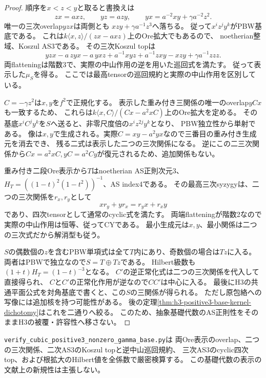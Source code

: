 \begin{proof}
順序を$x<z<y$と取ると書換えは
\[
 zx=axz,\qquad yz=azy,\qquad
 yx=a^{-2}xy+\gamma a^{-2}z^2.
\]
唯一の三次overlap$yzx$は両側とも
$xzy+\gamma a^{-1}z^3$へ落ちる。
従って$x^iz^jy^k$がPBW基底である。
これは$k\langle x,z\rangle/(zx-axz)$上のOre拡大でもあるので、
noetherian整域、Koszul AS3である。
その三次Koszul topは
\[
 yzx-a\,zyx-a\,yxz+a^{-1}xyz+a^{-1}zxy-xzy
                   +\gamma a^{-1}zzz.
\]
両flatteningは階数3で、実際の中山作用の逆を用いた巡回式を満たす。
従って表示した$\mu_S$を得る。
ここでは最高tensorの巡回規約と実際の中山作用を区別している。

$C=-\gamma z^2$は$x,y$を$f^2$で正規化する。
表示した重み付き三関係の唯一のoverlap$yCx$も一致するため、
これらは$k\langle x,C\rangle/(Cx-a^2xC)$上のOre拡大を定める。
その基底$x^iC^jy^k$を$S$へ送ると、非零尺度倍の$x^iz^{2j}y^k$となり、
PBW独立性から単射である。
像は$x,y$で生成される。実際$C=xy-a^2yx$なので三番目の重み付き生成元を消去でき、
残る二式は表示した二つの三次関係になる。
逆にこの二三次関係から$Cx=a^2xC,yC=a^2Cy$が復元されるため、追加関係もない。

重み付き二段Ore表示から$T$はnoetherian AS正則次元3、
$H_T=((1-t)^2(1-t^2))^{-1}$、AS index4である。
その最高三次syzygyは、二つの三次関係を$r_x,r_y$として
\[
 xr_y+yr_x=r_yx+r_xy
\]
であり、四次tensorとして通常のcyclic式を満たす。
両端flatteningが階数2なので実際の中山作用は恒等、従ってCYである。
最小生成元は$x,y$、最小関係は二つの三次式だから解消型も従う。

$S$の偶数個の$z$を含むPBW単項式は全て$T$内にあり、奇数個の場合は$Tz$に入る。
両者はPBWで独立なので$S=T\oplus Tz$である。
Hilbert級数も$(1+t)H_T=(1-t)^{-3}$となる。
$C'$の逆正常化式は二つの三次関係を代入して直接得られ、
$C$と$C'$の正常化作用が逆なので$CC'$は中心に入る。
最後にH3の共通平面公式を対角基底で書くと、この$S$の三関係が得られる。
ただし原包絡への写像には追加核を持つ可能性がある。
後の定理\ref{thm:h3-positive3-base-kernel-dichotomy}はこれを二通りへ絞る。
このため、抽象基礎代数のAS正則性をそのままH3の被覆・許容性へ移さない。
\end{proof}

\texttt{verify\_cubic\_positive3\_nonzero\_gamma\_base.py}は
両Ore表示のoverlap、二つの三次関係、二次AS3のKoszul topと逆中山巡回規約、
三次AS3のcyclic四次top、および根拡大のHilbert値を全係数で厳密検算する。
この基礎代数の表示の文献上の新規性は主張しない。


